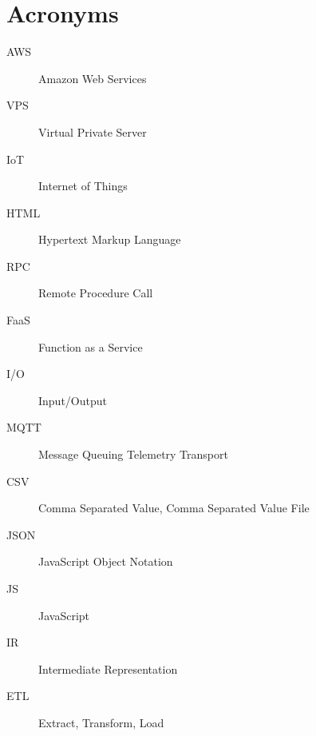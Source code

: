 \documentclass[../main.tex]{subfiles}
\begin{document}
\chapter{Acronyms}

\begin{description}
  \item[AWS] Amazon Web Services
  \item[VPS] Virtual Private Server
  \item[IoT] Internet of Things
  \item[HTML] Hypertext Markup Language
  \item[RPC] Remote Procedure Call
  \item[FaaS] Function as a Service
  \item[I/O] Input/Output
  \item[MQTT] Message Queuing Telemetry Transport
  \item[CSV] Comma Separated Value, Comma Separated Value File 
  \item[JSON] JavaScript Object Notation
  \item[JS] JavaScript
  \item[IR] Intermediate Representation
  \item[ETL] Extract, Transform, Load
\end{description}

\end{document}
